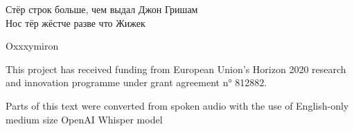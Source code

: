 \epigraph{Стёр строк больше, чем выдал Джон Гришам \\ Нос тёр жёстче разве что Жижек}{Oxxxymiron}

This project has received funding from European Union’s Horizon 2020 research and innovation programme under grant agreement n° 812882. 

Parts of this text were converted from spoken audio with the use of English-only medium size OpenAI Whisper model \cite{radfordRobustSpeechRecognition2022}